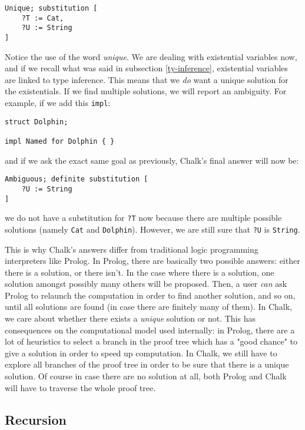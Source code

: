 \documentclass[twocolumn]{article}
\newcommand{\rust}[1]{\texttt{#1}}
\begin{document}
\begin{verbatim}
Unique; substitution [
    ?T := Cat,
    ?U := String
]
\end{verbatim}
Notice the use of the word \textit{unique}. We are dealing with existential variables now, and if we recall what was said in subsection \ref{ty-inference}, existential variables are linked to type inference. This means that we \textit{do} want a unique solution for the existentials. If we find multiple solutions, we will report an ambiguity. For example, if we add this \rust{impl}:
\begin{verbatim}
struct Dolphin;

impl Named for Dolphin { }
\end{verbatim}
and if we ask the exact same goal as previously, Chalk's final answer will now be:
\begin{verbatim}
Ambiguous; definite substitution [
    ?U := String
]
\end{verbatim}
we do not have a substitution for \rust{?T} now because there are multiple possible solutions (namely \rust{Cat} and \rust{Dolphin}). However, we are still sure that \rust{?U} is \rust{String}.

This is why Chalk's answers differ from traditional logic programming interpreters like Prolog. In Prolog, there are basically two possible answers: either there is a solution, or there isn't. In the case where there is a solution, one solution amongst possibly many others will be proposed. Then, a user \textit{can} ask Prolog to relaunch the computation in order to find another solution, and so on, until all solutions are found (in case there are finitely many of them). In Chalk, we care about whether there exists a \textit{unique} solution or not. This has consequences on the computational model used internally: in Prolog, there are a lot of heuristics to select a branch in the proof tree which has a "good chance" to give a solution in order to speed up computation. In Chalk, we still have to explore all branches of the proof tree in order to be sure that there is a unique solution. Of course in case there are no solution at all, both Prolog and Chalk will have to traverse the whole proof tree.

\subsection{Recursion}
\end{document}
